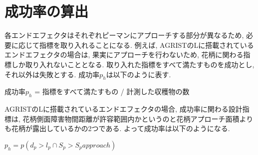 \section{成功率の算出}
各エンドエフェクタはそれぞれピーマンにアプローチする部分が異なるため, 必要に応じて指標を取り入れることになる.
例えば, AGRISTのLに搭載されているエンドエフェクタの場合は, 果実にアプローチを行わないため, 花柄に関わる指標しか取り入れないこととなる.
取り入れた指標をすべて満たすものを成功とし, それ以外は失敗とする.
成功率$p_h$は以下のように表す.

\vspace{10mm}
成功率$p_h$ = 指標をすべて満たすもの / 計測した収穫物の数
\vspace{10mm}

AGRISTのLに搭載されているエンドエフェクタの場合, 成功率に関わる設計指標は, 花柄側面障害物間距離が許容範囲内かというのと花柄アプローチ面積よりも花柄が露出しているかの2つである.
よって成功率は以下のようになる.

\vspace{10mm}
$p_h = p(d_p > l_p \cap S_p > S_papproach)$
\vspace{10mm}

